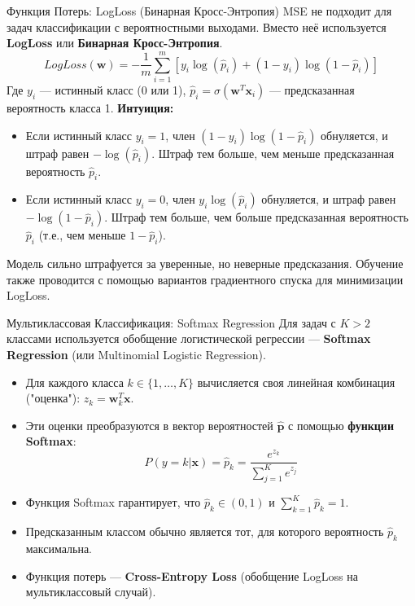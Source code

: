 \begin{myblock}{Функция Потерь: LogLoss (Бинарная Кросс-Энтропия)}
    MSE не подходит для задач классификации с вероятностными выходами. Вместо неё используется \textbf{LogLoss} или \textbf{Бинарная Кросс-Энтропия}.
    \[
    LogLoss(\mathbf{w}) = -\frac{1}{m} \sum_{i=1}^{m} [ y_i \log(\hat{p}_i) + (1 - y_i) \log(1 - \hat{p}_i) ]
    \]
    Где $y_i$ — истинный класс (0 или 1), $\hat{p}_i = \sigma(\mathbf{w}^T \mathbf{x}_i)$ — предсказанная вероятность класса 1.
    \textbf{Интуиция:}
    \begin{itemize}[nosep, leftmargin=*]
        \item Если истинный класс $y_i=1$, член $(1-y_i)\log(1-\hat{p}_i)$ обнуляется, и штраф равен $- \log(\hat{p}_i)$. Штраф тем больше, чем меньше предсказанная вероятность $\hat{p}_i$.
        \item Если истинный класс $y_i=0$, член $y_i\log(\hat{p}_i)$ обнуляется, и штраф равен $- \log(1 - \hat{p}_i)$. Штраф тем больше, чем больше предсказанная вероятность $\hat{p}_i$ (т.е., чем меньше $1-\hat{p}_i$).
    \end{itemize}
    Модель сильно штрафуется за уверенные, но неверные предсказания. Обучение также проводится с помощью вариантов градиентного спуска для минимизации LogLoss.
\end{myblock}

\begin{myexampleblock}{Мультиклассовая Классификация: Softmax Regression}
    Для задач с $K > 2$ классами используется обобщение логистической регрессии — \textbf{Softmax Regression} (или Multinomial Logistic Regression).
    \begin{itemize}[nosep, leftmargin=*]
        \item Для каждого класса $k \in \{1, \dots, K\}$ вычисляется своя линейная комбинация ("оценка"): $z_k = \mathbf{w}_k^T \mathbf{x}$.
        \item Эти оценки преобразуются в вектор вероятностей $\hat{\mathbf{p}}$ с помощью \textbf{функции Softmax}:
          \[ P(y=k | \mathbf{x}) = \hat{p}_k = \frac{e^{z_k}}{\sum_{j=1}^{K} e^{z_j}} \]
        \item Функция Softmax гарантирует, что $\hat{p}_k \in (0, 1)$ и $\sum_{k=1}^{K} \hat{p}_k = 1$.
        \item Предсказанным классом обычно является тот, для которого вероятность $\hat{p}_k$ максимальна.
        \item Функция потерь — \textbf{Cross-Entropy Loss} (обобщение LogLoss на мультиклассовый случай).
    \end{itemize}
\end{myexampleblock}

